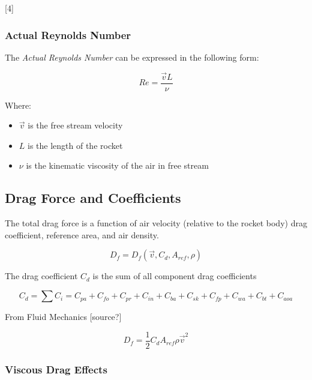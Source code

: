 \documentclass[]{article}
\providecommand{\tightlist}{%
  \setlength{\itemsep}{0pt}\setlength{\parskip}{0pt}}
\begin{document}
{[}4{]}

\subsubsection{Actual Reynolds Number}\label{actual-reynolds-number}

The \emph{Actual Reynolds Number} can be expressed in the following
form:

\begin{equation}
Re = \dfrac{\vec{v} L}{\nu} 
\end{equation}

Where:

\begin{itemize}
\tightlist
\item
  \(\vec{v}\) is the free stream velocity
\item
  \(L\) is the length of the rocket
\item
  \(\nu\) is the kinematic viscosity of the air in free stream
\end{itemize}

\subsection{Drag Force and
Coefficients}\label{drag-force-and-coefficients}

The total drag force is a function of air velocity (relative to the
rocket body) drag coefficient, reference area, and air density.

\begin{equation} 
D_f = D_f (\vec{v}, C_d, A_{ref}, \rho) 
\end{equation}

The drag coefficient \(C_d\) is the sum of all component drag
coefficients

\begin{equation} 
C_d = \sum C_i = C_{pa} + C_{fo} + C_{pr} + C_{in} + C_{ba} + C_{sk} + C_{fp} + C_{wa} + C_{bt} + C_{aoa}
\end{equation}

From Fluid Mechanics {[}source?{]}

\begin{equation}
D_f = \dfrac{1}{2} C_d A_{ref} \rho \vec{v}^2  
\end{equation}

\subsubsection{Viscous Drag Effects}\label{viscous-drag-effects}
\end{document}
